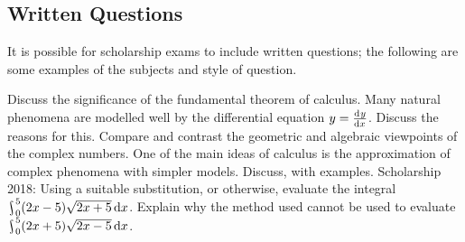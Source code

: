 \begin{questions}
\end{questions}

\clearpage
\subsection*{Written Questions}
It is possible for scholarship exams to include written questions; the following are some examples of the subjects and style of question.
\begin{questions}
  \question Discuss the significance of the fundamental theorem of calculus.
  \question Many natural phenomena are modelled well by the differential equation $ y = \od{y}{x} $. Discuss the reasons for this.
  \question Compare and contrast the geometric and algebraic viewpoints of the complex numbers.
  \question One of the main ideas of calculus is the approximation of complex phenomena with simpler models. Discuss, with examples.
  \question Scholarship 2018: Using a suitable substitution, or otherwise, evaluate the integral $ \rint^5_0 (2x - 5)\sqrt{2x + 5} \dif{x} $.
            Explain why the method used cannot be used to evaluate $ \rint^5_0 (2x + 5)\sqrt{2x - 5} \dif{x} $.
\end{questions}


